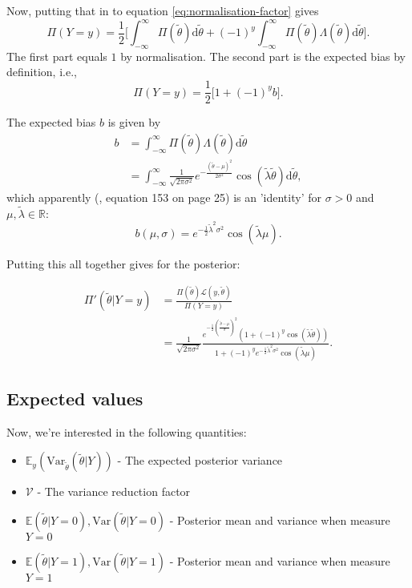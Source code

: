 \documentclass[]{report}
\begin{document}
Now, putting that in to equation \eqref{eq:normalisation-factor} gives
\begin{equation}
    \Pi(Y=y) = \frac{1}{2} \Big[ \int_{-\infty}^{\infty} \Pi(\tilde{\theta}) \text{d}\tilde{\theta} + (-1)^y \int_{-\infty}^{\infty} \Pi(\tilde{\theta}) \Lambda (\tilde{\theta}) \text{d} \tilde{\theta} \Big].
\end{equation}
The first part equals $1$ by normalisation. The second part is the expected bias by definition, i.e.,
\begin{equation}
     \Pi(Y=y) = \frac{1}{2} \Big[ 1 + (-1)^y b\Big].
\end{equation}

The expected bias $b$ is given by
\begin{align}
    b   &= \int_{-\infty}^{\infty} \Pi(\tilde{\theta}) \Lambda (\tilde{\theta}) \text{d} \tilde{\theta}\\
        &= \int_{-\infty}^{\infty} \frac{1}{\sqrt{2\pi \sigma^2}} e^{-\frac{(\tilde{\theta} - \mu)^2}{2\sigma^2}} \cos(\tilde{\lambda} \tilde{\theta}) \text{d} \tilde{\theta},
\end{align}
which apparently (\cite{Koh2020}, equation 153 on page 25) is an 'identity' for $\sigma > 0$ and $\mu, \tilde{\lambda} \in \mathbb{R}$:
\begin{equation}
\label{eq:b-gaussian}
    b(\mu, \sigma) = e^{-\frac{1}{2}\tilde{\lambda}^2\sigma^2} \cos (\tilde{\lambda} \mu).
\end{equation}


Putting this all together gives for the posterior:

\begin{align}
    \Pi'(\tilde{\theta}|Y = y)  &= \frac{\Pi(\tilde{\theta}) \mathcal{L} (y, \tilde{\theta})}{\Pi(Y=y)}\\
    &= \frac{1}{\sqrt{2\pi \sigma^2}}\frac{e^{-\frac{1}{2}(\frac{\tilde{\theta} - \mu}{\sigma})^2} ( 1 + (-1)^y \cos(\tilde{\lambda} \tilde{\theta}))}{1 + (-1)^y e^{-\frac{1}{2}\tilde{\lambda}^2\sigma^2} \cos (\tilde{\lambda} \mu)}.
\end{align}

\subsection{Expected values}
Now, we're interested in the following quantities:
\begin{itemize}
    \item $\mathbb{E}_y(\text{Var}_{\tilde{\theta}}(\tilde{\theta} | Y))$ - The expected posterior variance
    \item $\mathcal{V}$ - The variance reduction factor
    \item $\mathbb{E}(\tilde{\theta} | Y=0), \text{Var}(\tilde{\theta}|Y=0)$ - Posterior mean and variance when measure $Y=0$
    \item $\mathbb{E}(\tilde{\theta} | Y=1), \text{Var}(\tilde{\theta}|Y=1)$ - Posterior mean and variance when measure $Y=1$
\end{itemize}
\end{document}
